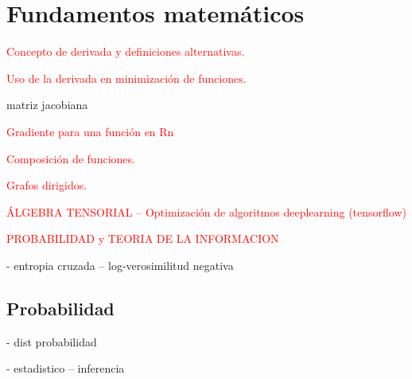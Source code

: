 \chapter{Fundamentos matemáticos}

\textcolor{red}{Concepto de derivada y definiciones alternativas.}

\textcolor{red}{Uso de la derivada en minimización de funciones.}

matriz jacobiana

\textcolor{red}{Gradiente para una función en Rn}

\textcolor{red}{Composición de funciones.}

\textcolor{red}{Grafos dirigidos.}

\textcolor{red}{ÁLGEBRA TENSORIAL -- Optimización de algoritmos deeplearning (tensorflow)}

\textcolor{red}{PROBABILIDAD y TEORIA DE LA INFORMACION}
		
		- entropia cruzada -- log-verosimilitud negativa

\section{Probabilidad} \label{prob}

 - dist probabilidad
 
 - estadistico -- inferencia
 